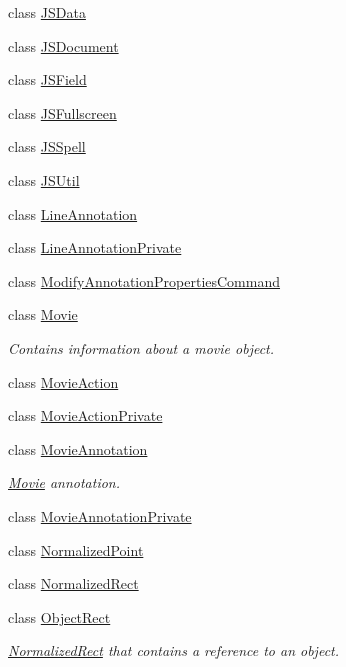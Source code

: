 \begin{DoxyCompactItemize}
\item 
class \hyperlink{classOkular_1_1JSData}{J\+S\+Data}
\item 
class \hyperlink{classOkular_1_1JSDocument}{J\+S\+Document}
\item 
class \hyperlink{classOkular_1_1JSField}{J\+S\+Field}
\item 
class \hyperlink{classOkular_1_1JSFullscreen}{J\+S\+Fullscreen}
\item 
class \hyperlink{classOkular_1_1JSSpell}{J\+S\+Spell}
\item 
class \hyperlink{classOkular_1_1JSUtil}{J\+S\+Util}
\item 
class \hyperlink{classOkular_1_1LineAnnotation}{Line\+Annotation}
\item 
class \hyperlink{classOkular_1_1LineAnnotationPrivate}{Line\+Annotation\+Private}
\item 
class \hyperlink{classOkular_1_1ModifyAnnotationPropertiesCommand}{Modify\+Annotation\+Properties\+Command}
\item 
class \hyperlink{classOkular_1_1Movie}{Movie}
\begin{DoxyCompactList}\small\item\em Contains information about a movie object. \end{DoxyCompactList}\item 
class \hyperlink{classOkular_1_1MovieAction}{Movie\+Action}
\item 
class \hyperlink{classOkular_1_1MovieActionPrivate}{Movie\+Action\+Private}
\item 
class \hyperlink{classOkular_1_1MovieAnnotation}{Movie\+Annotation}
\begin{DoxyCompactList}\small\item\em \hyperlink{classOkular_1_1Movie}{Movie} annotation. \end{DoxyCompactList}\item 
class \hyperlink{classOkular_1_1MovieAnnotationPrivate}{Movie\+Annotation\+Private}
\item 
class \hyperlink{classOkular_1_1NormalizedPoint}{Normalized\+Point}
\item 
class \hyperlink{classOkular_1_1NormalizedRect}{Normalized\+Rect}
\item 
class \hyperlink{classOkular_1_1ObjectRect}{Object\+Rect}
\begin{DoxyCompactList}\small\item\em \hyperlink{classOkular_1_1NormalizedRect}{Normalized\+Rect} that contains a reference to an object. \end{DoxyCompactList}\item 

\end{DoxyCompactItemize}
